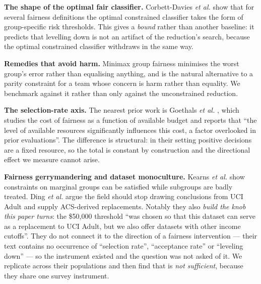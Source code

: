 \documentclass[conference]{IEEEtran}
\begin{document}
\textbf{The shape of the optimal fair classifier.} Corbett-Davies \emph{et al.}
\cite{corbett2017} show that for several fairness definitions the optimal constrained
classifier takes the form of group-specific risk thresholds. This gives a \emph{bound} rather
than another baseline: it predicts that levelling down is not an artifact of the reduction's
search, because the optimal constrained classifier withdraws in the same way.

\textbf{Remedies that avoid harm.} Minimax group fairness \cite{diana2021} minimises the worst
group's error rather than equalising anything, and is the natural alternative to a parity
constraint for a team whose concern is harm rather than equality. We benchmark against it
rather than only against the unconstrained reduction.

\textbf{The selection-rate axis.} The nearest prior work is Goethals \emph{et al.}
\cite{goethals2024}, which studies the cost of fairness as a function of available budget and
reports that ``the level of available resources significantly influences this cost, a factor
overlooked in prior evaluations''. The difference is structural: in their setting positive
decisions are a fixed resource, so the total is constant by construction and the directional
effect we measure cannot arise.

\textbf{Fairness gerrymandering and dataset monoculture.} Kearns \emph{et al.}
\cite{kearns2018} show constraints on marginal groups can be satisfied while subgroups are
badly treated. Ding \emph{et al.} \cite{ding2021} argue the field should stop drawing
conclusions from UCI Adult and supply ACS-derived replacements. Notably they also
\emph{build the knob this paper turns}: the \$50{,}000 threshold ``was chosen so that this
dataset can serve as a replacement to UCI Adult, but we also offer datasets with other income
cutoffs''. They do not connect it to the direction of a fairness intervention --- their text
contains no occurrence of ``selection rate'', ``acceptance rate'' or ``leveling down'' --- so
the instrument existed and the question was not asked of it. We replicate across their
populations and then find that is \emph{not sufficient}, because they share one survey
instrument.
\end{document}
